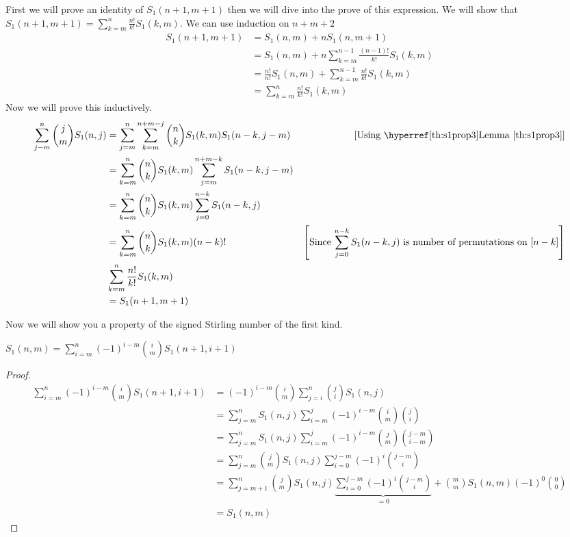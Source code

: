 \begin{alg-proof}
	First we will prove an identity of $S_1(n+1,m+1)$ then we will dive into the prove of this expression. We will show that  $S_1(n+1,m+1)=\sum\limits_{k=m}^n\frac{n!}{k!}S_1(k,m)$. We can use induction on $n+m+2$\begin{align*}
		S_1(n+1,m+1) & =S_1(n,m)+nS_1(n,m+1)                                          \\
		             & =S_1(n,m) +n\sum_{k=m}^{n-1}\frac{(n-1)!}{k!}S_1(k,m)          \\
		             & = \frac{n!}{n!}S_1(n,m) +\sum_{k=m}^{n-1}\frac{n!}{k!}S_1(k,m) \\
		             & =\sum_{k=m}^{n}\frac{n!}{k!}S_1(k,m)
	\end{align*}
	Now we will prove this inductively. 
	\begin{align*}
		\sum_{j-m}^n\binom{j}{m}S_1(n,j) & = \sum_{j=m}^n\sum_{k=m}^{n+m-j}\binom{n}{k}S_1(k,m)S_1(n-k,j-m) & [\text{Using \lmref{s1prop3}}]                                                                       \\
		                                 & = \sum_{k=m}^n\binom{n}{k}S_1(k,m)\sum_{j=m}^{n+m-k}S_1(n-k,j-m) &  \\
		                                 & = \sum_{k=m}^n\binom{n}{k}S_1(k,m)\sum_{j=0}^{n-k}S_1(n-k,j)     &  \\
		                                 & = \sum_{k=m}^n\binom{n}{k}S_1(k,m)(n-k)!                         & \lt[\text{Since $\displaystyle\sum_{j=0}^{n-k}S_1(n-k,j)$ is  number of permutations on $[n-k]$}\rt] \\
		                                 & \sum_{k=m}^n\frac{n!}{k!}S_1(k,m)                                &  \\
		                                 & = S_1(n+1,m+1)                                                   &
	\end{align*}

\end{alg-proof}

Now we will show you a property of the signed Stirling number of the first kind.
\begin{Theorem}{}{}
	$S_1(n,m)=\displaystyle\sum\limits_{i=m}^n(-1)^{i-m}\binom{i}{m}S_1(n+1,i+1)$
\end{Theorem}
\begin{proof}
	\begin{align*}
		\sum_{i=m}^n(-1)^{i-m}\binom{i}{m}S_1(n+1,i+1) & = (-1)^{i-m}\binom{i}{m}\sum_{j=i}^n\binom{j}{i}S_1(n,j)\\
		& = \sum_{j=m}^nS_1(n,j)\sum_{i=m}^j (-1)^{i-m}\binom{i}{m}\binom{j}{i}\\
		& = \sum_{j=m}^n S_1(n,j)\sum_{i=m}^j (-1)^{i-m}\binom{j}{m}\binom{j-m}{i-m}\\
		& = \sum_{j=m}^n \binom{j}{m}S_1(n,j)\sum_{i=0}^{j-m} (-1)^{i}\binom{j-m}{i}\\
		& = \sum_{j=m+1}^n \binom{j}{m}S_1(n,j)\underbrace{\sum_{i=0}^{j-m} (-1)^{i}\binom{j-m}{i}}_{=0}+\binom{m}{m}S_1(n,m)(-1)^0\binom{0}{0}\\
		& = S_1(n,m)
	\end{align*}
\end{proof}
